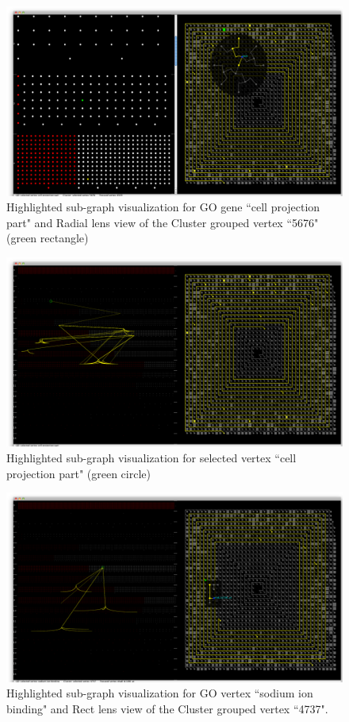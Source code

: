 \newpage
\begin{figure}[h!]
\centering
\includegraphics[scale=0.33, angle=90]{pictures/screenshot_3.png}
\caption{Highlighted sub-graph visualization for GO gene ``cell projection part" and Radial lens view of the Cluster grouped vertex ``5676" (green rectangle)}
\end{figure}

\newpage
\begin{figure}[h!]
\centering
\includegraphics[scale=0.33, angle=90]{pictures/screenshot_4.png}
\caption{Highlighted sub-graph visualization for selected vertex ``cell projection part" (green circle)}
\end{figure}

\newpage
\begin{figure}[h!]
\centering
\includegraphics[scale=0.33, angle=90]{pictures/screenshot_5.png}
\caption{Highlighted sub-graph visualization for GO vertex ``sodium ion binding" and Rect lens view of the Cluster grouped vertex ``4737".}
\end{figure}

